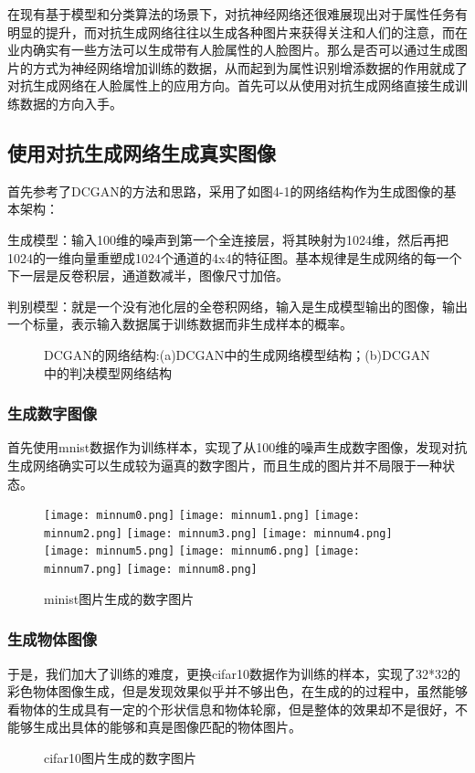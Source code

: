 在现有基于模型和分类算法的场景下，对抗神经网络还很难展现出对于属性任务有明显的提升，而对抗生成网络往往以生成各种图片来获得关注和人们的注意，而在业内确实有一些方法可以生成带有人脸属性的人脸图片。那么是否可以通过生成图片的方式为神经网络增加训练的数据，从而起到为属性识别增添数据的作用就成了对抗生成网络在人脸属性上的应用方向。首先可以从使用对抗生成网络直接生成训练数据的方向入手。
\subsection{使用对抗生成网络生成真实图像}
首先参考了DCGAN\cite{DCGAN}的方法和思路，采用了如图4-1的网络结构作为生成图像的基本架构：

生成模型：输入100维的噪声到第一个全连接层，将其映射为1024维，然后再把1024的一维向量重塑成1024个通道的4x4的特征图。基本规律是生成网络的每一个下一层是反卷积层，通道数减半，图像尺寸加倍。

判别模型：就是一个没有池化层的全卷积网络，输入是生成模型输出的图像，输出一个标量，表示输入数据属于训练数据而非生成样本的概率。
\begin{figure}[h]
  \centering
  \caption{DCGAN的网络结构:(a)DCGAN中的生成网络模型结构；(b)DCGAN中的判决模型网络结构}
\end{figure}

\subsubsection{生成数字图像}
首先使用mnist数据\cite{MNIST}作为训练样本，实现了从100维的噪声生成数字图像，发现对抗生成网络确实可以生成较为逼真的数字图片，而且生成的图片并不局限于一种状态。
\begin{figure}[!ht]
 \centering 
	\texttt{[image: minnum0.png]}
	\texttt{[image: minnum1.png]}
	\texttt{[image: minnum2.png]}
	\texttt{[image: minnum3.png]}
	\texttt{[image: minnum4.png]}
	\texttt{[image: minnum5.png]}
	\texttt{[image: minnum6.png]}
	\texttt{[image: minnum7.png]}
	\texttt{[image: minnum8.png]}
	\caption{minist图片生成的数字图片}
\end{figure}

\subsubsection{生成物体图像}
于是，我们加大了训练的难度，更换cifar10\cite{CIFAR10}数据作为训练的样本，实现了32*32的彩色物体图像生成，但是发现效果似乎并不够出色，在生成的的过程中，虽然能够看物体的生成具有一定的个形状信息和物体轮廓，但是整体的效果却不是很好，不能够生成出具体的能够和真是图像匹配的物体图片。
\begin{figure}[h]
 \centering 
	\caption{cifar10图片生成的数字图片}
\end{figure}

